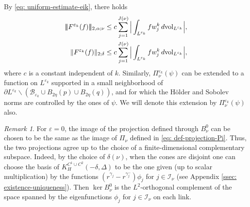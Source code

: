 \documentclass[11pt]{amsart}
\DeclarePairedDelimiter{\tnorm}{\vert\!\vert\!\vert}{\vert\!\vert\!\vert}
\theoremstyle{definition}
\theoremstyle{remark}
\newtheorem{remark}{Remark}
\newcommand{\vol}{\mathrm{vol}}
\begin{document}
By \eqref{eq: uniform-estimate-eik}, there holds
\begin{align}
    \tnorm{F^{\varepsilon_k}(f)}_{2, \alpha; \nu} &\leq c \sum_{j = 1}^{J(\nu)}\Big|\int_{L^{\varepsilon_k}} f w_j^k \, d\vol_{L^{\varepsilon_k}} \Big|,  \label{Fest} \\
    \|F^{\varepsilon_k}(f)\|_{2;\delta } &\leq c \sum_{j = 1}^{J(\nu)}\Big|\int_{L^{\varepsilon_k}} f w_j^k \, d\vol_{L^{\varepsilon_k}} \Big|, \label{Fest2}
\end{align}
where $c$ is a constant independent of $k$. Similarly, $\Pi_\nu^{\varepsilon_k}(\psi)$ can be extended to a function on $L^{\varepsilon_k}$ supported in a small neighborhood of $\partial L^{\varepsilon_k}\smallsetminus(\mathscr{B}_{\varepsilon_k}\cup B_{2\eta}(p)\cup B_{2\eta}(q))$, and for which the H\"older and Sobolev norms are controlled by the ones of $\psi$. We will denote this extension by $\Pi_\nu^{\varepsilon_k}(\psi)$ also.
\begin{remark}
    For \(\varepsilon=0\), the image of the projection defined through \(B_\nu^0\) can be chosen to be the same as the image of $\Pi_{\nu}$ defined in \eqref{eq: def-projection-Pi}. Thus, the two projections agree up to
the choice of a finite-dimensional complementary subspace. Indeed, by the choice of $\delta(\nu)$, when the cones are disjoint one can choose the basis of $K_H^{C^1\cup C^2}(-\delta,\Delta)$ to be the one given (up to scalar multiplication) by the functions $(r^{\gamma_j}-r^{\gamma_j^-})\phi_j$ for $j\in \mathcal{I}_{\nu}$ (see Appendix \ref{ssec: existence-uniqueness}). Then \(\ker B_\nu^0\) is the \(L^2\)-orthogonal complement of the space spanned by the eigenfunctions \(\phi_j\) for $j\in \mathcal{I}_{\nu}$ on each link.
\end{remark}
\end{document}
